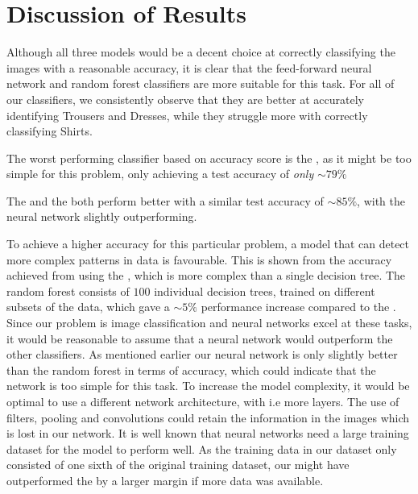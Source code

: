 \section{Discussion of Results}
Although all three models would be a decent choice at correctly classifying the images with a reasonable accuracy, it is clear that the feed-forward neural network and random forest classifiers are more suitable for this task.
For all of our classifiers, we consistently observe that they are better at accurately identifying Trousers and Dresses, while they struggle more with correctly classifying Shirts.
\newline

The worst performing classifier based on accuracy score is the , as it might be too simple for this problem, only achieving a test accuracy of \textit{only} $\sim79\%$
\newline

The  and the  both perform better with a similar test accuracy of $\sim85\%$, with the neural network slightly outperforming.
\newline

To achieve a higher accuracy for this particular problem, a model that can detect more complex patterns in data is favourable.
This is shown from the accuracy achieved from using the , which is more complex than a single decision tree.
The random forest consists of $100$ individual decision trees, trained on different subsets of the data, which gave a $\sim5\%$ performance increase compared to the .
\newline
\newline
Since our problem is image classification and neural networks excel at these tasks, it would be reasonable to assume that a neural network would outperform the other classifiers.
As mentioned earlier our neural network is only slightly better than the random forest in terms of accuracy, which could indicate that the network is too simple for this task.
To increase the model complexity, it would be optimal to use a different network architecture, with i.e more layers.
The use of filters, pooling and convolutions could retain the information in the images which is lost in our network.
It is well known that neural networks need a large training dataset for the model to perform well.
As the training data in our dataset only consisted of one sixth of the original training dataset,
our  might have outperformed the  by a larger margin if more data was available.